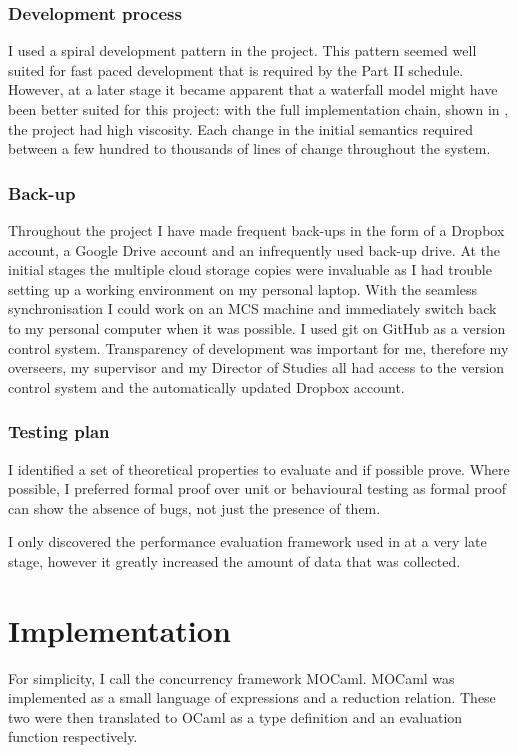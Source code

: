 \documentclass[12pt,twoside,notitlepage]{report}
\begin{document}
\subsection{Development process}
I used a spiral development pattern in the project. This pattern seemed well suited for fast paced development that is required by the Part II schedule. However, at a later stage it became apparent that a waterfall model might have been better suited for this project: with the full implementation chain, shown in , the project had high viscosity. Each change in the initial semantics required between a few hundred to thousands of lines of change throughout the system. 
\subsection{Back-up}
Throughout the project I have made frequent back-ups in the form of a Dropbox account, a Google Drive account and an infrequently used back-up drive. At the initial stages the multiple cloud storage copies were invaluable as I had trouble setting up a working environment on my personal laptop. With the seamless synchronisation I could work on an MCS machine and immediately switch back to my personal computer when it was possible.  I used git on GitHub as a version control system. Transparency of development was important for me, therefore my overseers, my supervisor and my Director of Studies all had access to the version control system and the automatically updated Dropbox account.
\subsection{Testing plan}
I identified a set of theoretical properties to evaluate and if possible prove. Where possible, I preferred formal proof over unit or behavioural testing as formal proof can show the absence of bugs, not just the presence of them. 

I only discovered the performance evaluation framework used in  at a very late stage, however it greatly increased the amount of data that was collected.

\cleardoublepage
\chapter{Implementation}
For simplicity, I call the concurrency framework MOCaml. MOCaml was implemented as a small language of expressions and a reduction relation.  These two were then translated to OCaml as a type definition and an evaluation function respectively. 
\end{document}
